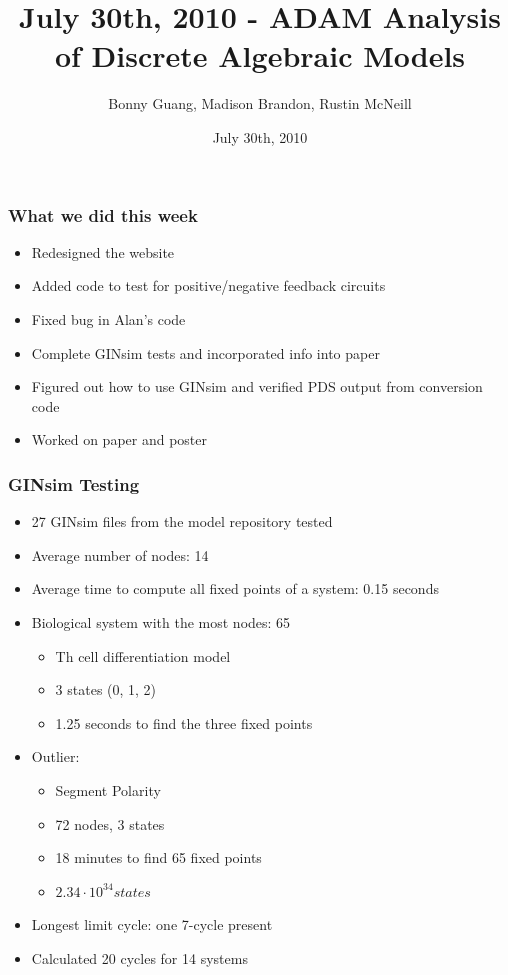 \documentclass{beamer}
\title{July 30th, 2010 - ADAM Analysis of Discrete Algebraic Models}
\author{Bonny Guang, Madison Brandon, Rustin McNeill}
\date{July 30th, 2010}
\begin{document}


\maketitle

\begin{frame}
	\frametitle{What we did this week}
	\begin{itemize}
	  \item{Redesigned the website}
		\item{Added code to test for positive/negative feedback circuits}
		\item{Fixed bug in Alan's code}
		\item{Complete GINsim tests and incorporated info into paper}
		\item{Figured out how to use GINsim and verified PDS output from conversion code}
		\item{Worked on paper and poster}
	\end{itemize}
\end{frame}

\begin{frame}
	\frametitle{GINsim Testing}
\begin{itemize}
	\item{27 GINsim files from the model repository tested}
	\item{Average number of nodes: 14}
	\item{Average time to compute all fixed points of a system: 0.15 seconds}
	\item{Biological system with the most nodes: 65}
	\begin{itemize}
		\item{Th cell differentiation model}
		\item{3 states (0, 1, 2)}
		\item{1.25 seconds to find the three fixed points}
	\end{itemize}
	\item{Outlier:}
	\begin{itemize}
		\item{Segment Polarity}
		\item{72 nodes, 3 states}
		\item{18 minutes to find 65 fixed points}
		\item{$2.34 \cdot 10^{34} states$}
	\end{itemize}
	\item{Longest limit cycle: one 7-cycle present}
	\item{Calculated 20 cycles for 14 systems}
\end{itemize}

	
	

\end{frame}
\end{document}
